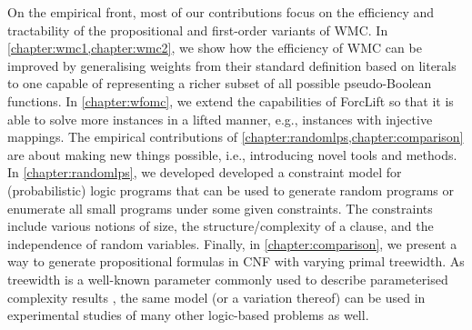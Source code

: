 On the empirical front, most of our contributions focus on the efficiency and tractability of the propositional and first-order variants of WMC. In \cref{chapter:wmc1,chapter:wmc2}, we show how the efficiency of WMC can be improved by generalising weights from their standard definition based on literals to one capable of representing a richer subset of all possible pseudo-Boolean functions. In \cref{chapter:wfomc}, we extend the capabilities of ForcLift \citep{DBLP:conf/ijcai/BroeckTMDR11} so that it is able to solve more instances in a lifted manner, e.g., instances with injective mappings. The empirical contributions of \cref{chapter:randomlps,chapter:comparison} are about making new things possible, i.e., introducing novel tools and methods. In \cref{chapter:randomlps}, we developed developed a constraint model for (probabilistic) logic programs that can be used to generate random programs or enumerate all small programs under some given constraints. The constraints include various notions of size, the structure/complexity of a clause, and the independence of random variables. Finally, in \cref{chapter:comparison}, we present a way to generate propositional formulas in CNF with varying primal treewidth. As treewidth is a well-known parameter commonly used to describe parameterised complexity results \citep{DBLP:series/txcs/DowneyF13}, the same model (or a variation thereof) can be used in experimental studies of many other logic-based problems as well.


